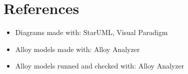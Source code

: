 \section{References}
\begin{itemize}
    \item Diagrams made with: StarUML, Visual Paradigm
    \item Alloy models made with: Alloy Analyzer
    \item Alloy models runned and checked with: Alloy Analyzer
\end{itemize}